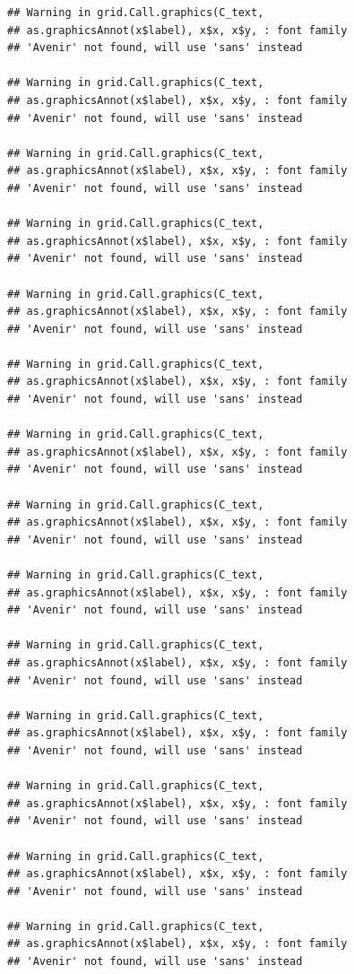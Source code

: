 \documentclass[]{krantz}
\begin{document}
\begin{verbatim}
## Warning in grid.Call.graphics(C_text,
## as.graphicsAnnot(x$label), x$x, x$y, : font family
## 'Avenir' not found, will use 'sans' instead

## Warning in grid.Call.graphics(C_text,
## as.graphicsAnnot(x$label), x$x, x$y, : font family
## 'Avenir' not found, will use 'sans' instead

## Warning in grid.Call.graphics(C_text,
## as.graphicsAnnot(x$label), x$x, x$y, : font family
## 'Avenir' not found, will use 'sans' instead

## Warning in grid.Call.graphics(C_text,
## as.graphicsAnnot(x$label), x$x, x$y, : font family
## 'Avenir' not found, will use 'sans' instead

## Warning in grid.Call.graphics(C_text,
## as.graphicsAnnot(x$label), x$x, x$y, : font family
## 'Avenir' not found, will use 'sans' instead

## Warning in grid.Call.graphics(C_text,
## as.graphicsAnnot(x$label), x$x, x$y, : font family
## 'Avenir' not found, will use 'sans' instead

## Warning in grid.Call.graphics(C_text,
## as.graphicsAnnot(x$label), x$x, x$y, : font family
## 'Avenir' not found, will use 'sans' instead

## Warning in grid.Call.graphics(C_text,
## as.graphicsAnnot(x$label), x$x, x$y, : font family
## 'Avenir' not found, will use 'sans' instead

## Warning in grid.Call.graphics(C_text,
## as.graphicsAnnot(x$label), x$x, x$y, : font family
## 'Avenir' not found, will use 'sans' instead

## Warning in grid.Call.graphics(C_text,
## as.graphicsAnnot(x$label), x$x, x$y, : font family
## 'Avenir' not found, will use 'sans' instead

## Warning in grid.Call.graphics(C_text,
## as.graphicsAnnot(x$label), x$x, x$y, : font family
## 'Avenir' not found, will use 'sans' instead

## Warning in grid.Call.graphics(C_text,
## as.graphicsAnnot(x$label), x$x, x$y, : font family
## 'Avenir' not found, will use 'sans' instead

## Warning in grid.Call.graphics(C_text,
## as.graphicsAnnot(x$label), x$x, x$y, : font family
## 'Avenir' not found, will use 'sans' instead

## Warning in grid.Call.graphics(C_text,
## as.graphicsAnnot(x$label), x$x, x$y, : font family
## 'Avenir' not found, will use 'sans' instead


\end{verbatim}
\end{document}
